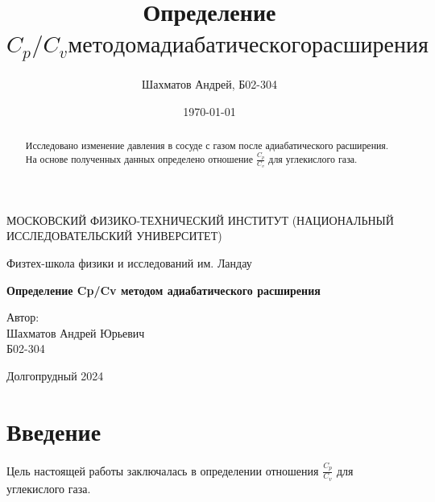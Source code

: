 \documentclass[12pt]{article}
\title{Определение $C_p/C_v методом адиабатического расширения$}
\author{Шахматов Андрей, Б02-304}
\date{\today}
\begin{document}
\begin{titlepage}
    \begin{center}
        {\large МОСКОВСКИЙ ФИЗИКО-ТЕХНИЧЕСКИЙ ИНСТИТУТ (НАЦИОНАЛЬНЫЙ ИССЛЕДОВАТЕЛЬСКИЙ УНИВЕРСИТЕТ)}
    \end{center}
    \begin{center}
        {\large Физтех-школа физики и исследований им. Ландау}
    \end{center}
    
    
    \vspace{3cm}
    {\huge
        \begin{center}
            \textbf{Определение Cp/Cv методом адиабатического расширения}
        \end{center}
    }
    \vspace{2cm}
    \begin{flushright}
        {\LARGE Автор:\\ Шахматов Андрей Юрьевич \\
            \vspace{0.2cm}
            Б02-304}
    \end{flushright}
    \vspace{7 cm}
    \begin{center}
        Долгопрудный 2024
    \end{center}
\end{titlepage}


\begin{abstract}
    Исследовано изменение давления в сосуде с газом после адиабатического расширения. На основе полученных 
    данных определено отношение $\frac{C_p}{C_v}$ для углекислого газа.       
\end{abstract}
\tableofcontents

\section{Введение}
Цель настоящей работы заключалась в определении отношения $\frac{C_p}{C_v}$ для углекислого газа. 
\end{document}
